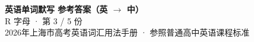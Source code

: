 \documentclass[10pt,a4paper]{article}
\begin{document}
\pagestyle{plain}

\begin{center}
{\LARGE\bfseries 英语单词默写 \quad 参考答案（英 $\to$ 中）}\\[0.22em]
{\large R 字母 · 第 3 / 5 份}\\[0.18em]
{\small 2026年上海市高考英语词汇用法手册 · 参照普通高中英语课程标准}
\end{center}

\vspace{0.2em}
\noindent{\color{rulegray}\rule{\textwidth}{0.8pt}}

\vspace{0.35em}

\vspace{0.25em}
\renewcommand{\arraystretch}{1.32}
\end{document}
